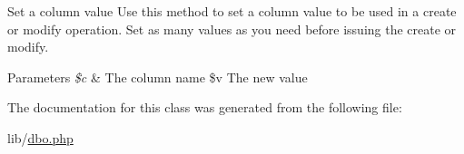 Set a column value Use this method to set a column value to be used in a create or modify operation. Set as many values as you need before issuing the create or modify. 


\begin{DoxyParams}{Parameters}
{\em \$c} & The column name  \$v The new value \\
\hline
\end{DoxyParams}


The documentation for this class was generated from the following file\+:\begin{DoxyCompactItemize}
\item 
lib/\hyperlink{dbo_8php}{dbo.\+php}\end{DoxyCompactItemize}
